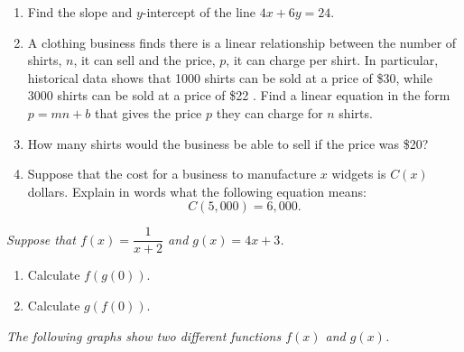 \documentclass[10pt]{article}
\begin{document}
\begin{enumerate}
\setcounter{enumi}{\theenumCount}
\item Find the slope and $y$-intercept of the line $4x + 6y = 24$.
\vfill


\item A clothing business finds there is a linear relationship between the number of shirts, $n$, it can
sell and the price, $p$, it can charge per shirt. In particular, historical data shows that 1000
shirts can be sold at a price of \$30, while 3000 shirts can be sold at a price of \$22 . Find a
linear equation in the form $p = mn + b$ that gives the price $p$ they can charge for $n$ shirts.\vfill

\item How many shirts would the business be able to sell if the price was \$20? 
\vfill


\newpage

\item  Suppose that the cost for a business to manufacture $x$ widgets is $C(x)$ dollars.  Explain in words what the following equation means:
$$C(5{,}000) = 6{,}000.$$
\vfill
\setcounter{enumCount}{\theenumi}
\end{enumerate}



\noindent
\textit{Suppose that $f(x) = \dfrac{1}{x+2}$ and $g(x) = 4x+3$.}
\begin{multicols}{2}
\begin{enumerate}
\setcounter{enumi}{\theenumCount}
\item Calculate $f(g(0))$.
\item Calculate $g(f(0))$.
\setcounter{enumCount}{\theenumi}
\end{enumerate}
\end{multicols}
\vfill

\noindent
\textit{The following graphs show two different functions $f(x)$ and $g(x)$.}
\end{document}
